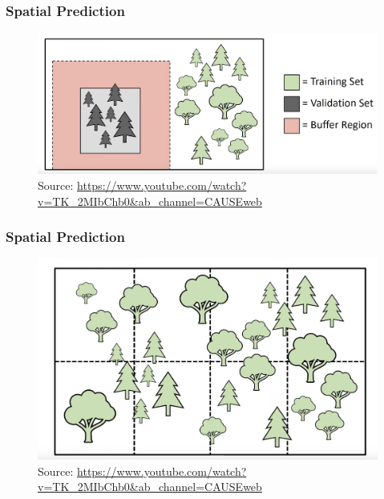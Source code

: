 \documentclass[
  shownotes,
  xcolor={svgnames},
  hyperref={colorlinks,citecolor=DarkBlue,linkcolor=andesred,urlcolor=DarkBlue}
  , aspectratio=169]{beamer}
\begin{document}
\begin{frame}[fragile]
\frametitle{Spatial Prediction}

\begin{figure}[H] \centering
            \captionsetup{justification=centering}
\includegraphics[scale=0.3]{figures/spatial_cross/fig12.png}
\\
\tiny
Source: \url{https://www.youtube.com/watch?v=TK_2MIbChb0&ab_channel=CAUSEweb}
 \end{figure}
\end{frame}

\begin{frame}[fragile]
\frametitle{Spatial Prediction}

\begin{figure}[H] \centering
            \captionsetup{justification=centering}
\includegraphics[scale=0.4]{figures/spatial_cross/fig13.png}
\\
\tiny
Source: \url{https://www.youtube.com/watch?v=TK_2MIbChb0&ab_channel=CAUSEweb}
 \end{figure}
\end{frame}
\end{document}
